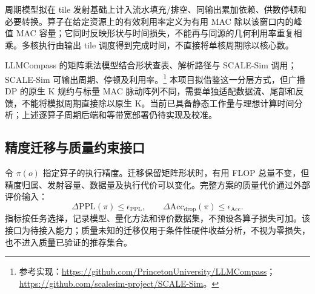 周期模型拟在 tile 发射基础上计入流水填充/排空、同输出累加依赖、供数停顿和必要转换。算子在给定资源上的有效利用率定义为有用 MAC 除以该窗口内的峰值 MAC 容量；它同时反映形状与时间损失，不能再与同源的几何利用率重复相乘。多核执行由输出 tile 调度得到完成时间，不直接将单核周期除以核心数。

LLMCompass 的矩阵乘法模型结合形状查表、解析路径与 SCALE-Sim 调用；SCALE-Sim 可输出周期、停顿及利用率。\footnote{参考实现：\url{https://github.com/PrincetonUniversity/LLMCompass}；\url{https://github.com/scalesim-project/SCALE-Sim}。} 本项目拟借鉴这一分层方式，但广播 DP 的原生 K 规约与标量 MAC 脉动阵列不同，需要单独适配数据流、尾部和反馈，不能将模拟周期直接除以原生 K。当前已具备静态工作量与理想计算时间分析；上述逐算子周期后端和等带宽部署仍待实现及校准。

\subsection{精度迁移与质量约束接口}
\label{sec:quality_model}

令 $\pi(o)$ 指定算子的执行精度。迁移保留矩阵形状时，有用 FLOP 总量不变，但精度归属、发射容量、数据量及执行代价可以变化。完整方案的质量代价通过外部评价输入：
\begin{equation}
\Delta\mathrm{PPL}(\pi)\le\epsilon_{\mathrm{PPL}},\qquad
\Delta\mathrm{Acc}_{\mathrm{drop}}(\pi)\le\epsilon_{\mathrm{Acc}}.
\label{eq:quality_constraint}
\end{equation}
指标按任务选择，记录模型、量化方法和评价数据集，不预设各算子损失可加。该接口为待接入能力；质量未知的迁移仅用于条件性硬件收益分析，不视为零损失，也不进入质量已验证的推荐集合。
